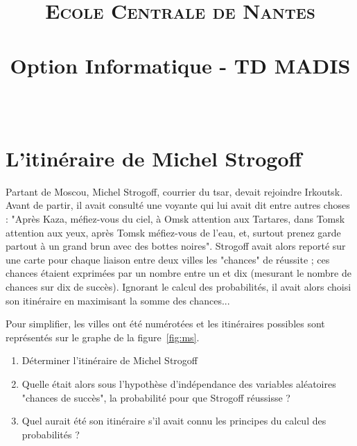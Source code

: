 \documentclass[paper=a4, fontsize=11pt]{scrartcl} %
\title{	
\normalfont \normalsize 
\textsc{Ecole Centrale de Nantes} \\ [25pt] %
\horrule{0.5pt} \\[0.4cm] %
\huge Option Informatique - TD MADIS \\ %
\horrule{2pt} \\[0.5cm] %
}
\numberwithin{equation}{section} %
\numberwithin{figure}{section} %
\numberwithin{table}{section} %
\begin{document}
\maketitle %

\section{L'itinéraire de Michel Strogoff}

Partant de Moscou, Michel Strogoff, courrier du tsar, devait rejoindre Irkoutsk. Avant de partir, il avait consulté une voyante qui lui avait dit entre autres choses : 
"Après Kaza, méfiez-vous du ciel, à Omsk attention aux Tartares, dans Tomsk attention aux yeux, après Tomsk méfiez-vous de l'eau, et, surtout prenez garde partout à un grand brun avec des bottes noires". Strogoff avait alors reporté sur une carte pour chaque liaison entre deux villes les "chances" de réussite ; ces chances étaient exprimées par un nombre entre un et dix (mesurant le nombre de chances sur dix de succès). Ignorant le calcul des probabilités, il avait alors choisi son itinéraire en maximisant la somme des chances...

Pour simplifier, les villes ont été numérotées et les itinéraires possibles sont représentés sur le graphe de la figure~\ref{fig:ms}.

\begin{enumerate}
\item Déterminer l'itinéraire de Michel Strogoff
\item Quelle était alors sous l'hypothèse d'indépendance des variables aléatoires "chances de succès", la probabilité pour que Strogoff réussisse ?
\item Quel aurait été son itinéraire s'il avait connu les principes du calcul des probabilités ?
\end{enumerate}
\end{document}
